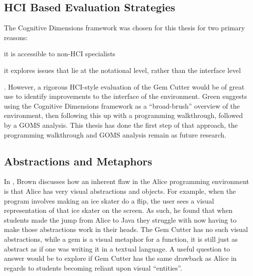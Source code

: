 \subsection{HCI Based Evaluation Strategies}

The Cognitive Dimensions framework was chosen for this thesis for two primary reasons: 
\begin{inparaenum}[(i)]
	\item it is accessible to non-HCI specialists
	\item it explores issues that lie at the notational level, rather than the interface level
\end{inparaenum}.  However, a rigorous HCI-style evaluation of the Gem Cutter would be of great use to identify improvements to the interface of the environment.  Green suggests using the Cognitive Dimensions framework as a ``broad-brush'' overview of the environment, then following this up with a programming walkthrough, followed by a GOMS analysis.  This thesis has done the first step of that approach, the programming walkthrough and GOMS analysis remain as future research.

\subsection{Abstractions and Metaphors}

In \cite{brown08}, Brown discusses how an inherent flaw in the Alice programming environment is that Alice has very visual abstractions and objects.  For example, when the program involves making an ice skater do a flip, the user sees a visual representation of that ice skater on the screen.  As such, he found that when students made the jump from Alice to Java they struggle with now having to make those abstractions work in their heads.  The Gem Cutter has no such visual abstractions, while a gem is a visual metaphor for a function, it is still just as abstract as if one was writing it in a textual language.  A useful question to answer would be to explore if Gem Cutter has the same drawback as Alice in regards to students becoming reliant upon visual ``entities''.